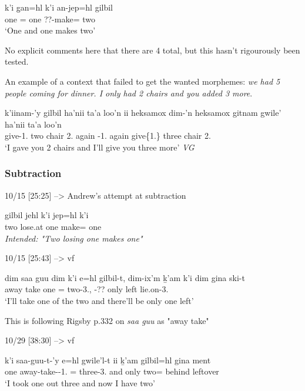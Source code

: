 \documentclass{article}
\begin{document}
\begin{exe}
\ex \gll k'i g̱an=hl k'i an-jep=hl gilbil\\
one \Pcnj{}=\Cn{} one ??-make=\Cn{} two\\
`One and one makes two'
\end{exe}
No explicit comments here that there are 4 total, but this hasn't rigourously been tested.

An example of a context that failed to get the wanted morphemes:
\textit{we had 5 people coming for dinner. I only had 2 chairs and you added 3 more}.
\begin{exe}
\ex \gll k'iinam-'y gilbil ha'nii ta'a loo'n  ii heksamox dim-'n heksamox gitnam gwile' ha'nii ta'a loo'n\\
give-1.\Ii{} two chair {} 2.\Prep{} \Ccnj{} again \Fut{}-1.\I{} again give\{1.\Ii{}\} three chair {} 2.\Prep{}\\
`I gave you 2 chairs and I'll give you three more' \textit{VG}
\end{exe}

\subsubsection{Subtraction}

10/15 [25:25] --> Andrew's attempt at subtraction
\begin{exe}
\ex \gll gilbil jehl k'i jep=hl k'i\\
two lose.at one make=\Cn{} one\\
\textit{Intended: "Two losing one makes one"}
\end{exe}

10/15 [25:43] --> vf
\begin{exe}
\ex \gll dim saa guu dim k'i e=hl gilbil-t, dim-ix'm ḵ'am k'i dim gina ski-t\\
\Fut{} away take \Fut{} one \Prep{}=\Cn{} two-3.\Ii{}, \Fut{}-?? only \Fut{} left lie.on-3.\Ii{}\\
`I'll take one of the two and there'll be only one left'
\end{exe}
This is following Rigsby p.332 on \textit{saa guu} as "away take"

10/29 [38:30] --> vf
\begin{exe}
\ex \gll k'i saa-guu-t-'y e=hl gwile'l-t ii ḵ'am gilbil=hl gina ment\\
one away-take-\Trn{}-1.\Ii{} \Prep{}=\Cn{} three-3.\Ii{} and only two=\Cn{} behind leftover\\
`I took one out three and now I have two'
\end{exe}
\end{document}
